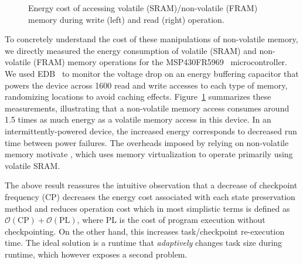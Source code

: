 \begin{figure}
	\centering
	\caption{Energy cost of accessing volatile (SRAM)/non-volatile (FRAM) memory during write (left) and read (right) operation.}
	\label{fig:framEnergy}
\end{figure}

To concretely understand the cost of these manipulations of non-volatile memory, we directly measured the energy consumption of volatile (SRAM) and non-volatile (FRAM) memory operations for the MSP430FR5969~\cite{msp430datasheet} microcontroller. We used EDB~\cite{edb} to monitor the voltage drop on an energy buffering capacitor that powers the device across 1600 read and write accesses to each type of memory, randomizing locations to avoid caching effects. Figure~\ref{fig:framEnergy} summarizes these measurements, illustrating that a non-volatile memory access consumes around 1.5 times as much energy as a volatile memory access in this device. In an intermittently-powered device, the increased energy corresponds to decreased run time between power failures. The overheads imposed by relying on non-volatile memory motivate \sys, which uses memory virtualization to operate primarily using volatile SRAM.

The above result reassures the intuitive observation that a decrease of checkpoint frequency (CP) decreases the energy cost associated with each state preservation method and reduces operation cost which in most simplistic terms is defined as $\mathcal{O}(\text{CP})+\mathcal{O}(\text{PL})$, where PL is the cost of program execution without checkpointing. On the other hand, this increases task/checkpoint re-execution time. The ideal solution is a runtime that \emph{adaptively} changes task size during runtime, which however exposes a second problem.

